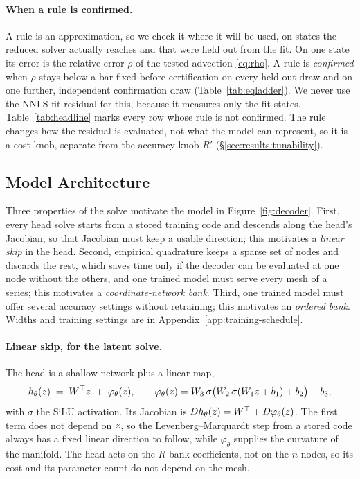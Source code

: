 \documentclass{article}
\begin{document}
\paragraph{When a rule is confirmed.}
A rule is an approximation, so we check it where it will be used, on
states the reduced solver actually reaches and that were held out from
the fit. On one state its error is the relative error $\rho$ of the
tested advection \eqref{eq:rho}. A rule is \emph{confirmed} when $\rho$
stays below a bar fixed before certification on every held-out draw and
on one further, independent confirmation draw (Table~\ref{tab:eqladder}).
We never use the NNLS fit residual for this, because it measures only the
fit states. Table~\ref{tab:headline} marks every row whose rule is not
confirmed. The rule changes how the residual is evaluated, not what the
model can represent, so it is a cost knob, separate from the accuracy
knob $R'$ (\S\ref{sec:results:tunability}).

\subsection{Model Architecture}
\label{sec:decoder}

Three properties of the solve motivate the model in
Figure~\ref{fig:decoder}. First, every head solve starts from a stored
training code and descends along the head's Jacobian, so that Jacobian
must keep a usable direction; this motivates a \emph{linear skip} in the
head. Second, empirical quadrature keeps a sparse set of nodes and
discards the rest, which saves time only if the decoder can be evaluated
at one node without the others, and one trained model must serve every
mesh of a series; this motivates a \emph{coordinate-network bank}. Third,
one trained model must offer several accuracy settings without
retraining; this motivates an \emph{ordered bank}. Widths and training
settings are in Appendix~\ref{app:training-schedule}.

\paragraph{Linear skip, for the latent solve.}
The head is a shallow network plus a linear map,
\begin{equation}
  h_\theta(z) \;=\; W^{\top}z \;+\; \varphi_\theta(z),
  \qquad
  \varphi_\theta(z)=W_3\,\sigma\big(W_2\,\sigma(W_1z+b_1)+b_2\big)+b_3,
  \label{eq:head}
\end{equation}
with $\sigma$ the SiLU activation. Its Jacobian is
$Dh_\theta(z)=W^{\top}+D\varphi_\theta(z)$. The first term does not
depend on $z$, so the Levenberg--Marquardt step from a stored code
always has a fixed linear direction to follow, while $\varphi_\theta$
supplies the curvature of the manifold. The head acts on the $R$ bank
coefficients, not on the $n$ nodes, so its cost and its parameter count do
not depend on the mesh.
\end{document}
